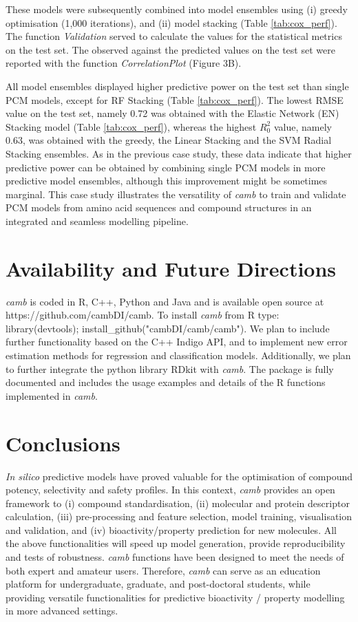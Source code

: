 \documentclass{bmcart}
\begin{document}
These models were subsequently combined into model ensembles using
(i) greedy optimisation (1,000 iterations), and (ii) model stacking (Table \ref{tab:cox_perf}).
The function {\it Validation} served to calculate the values for the statistical metrics on the test set.
The observed against the predicted values on the test set 
were reported with the function {\it CorrelationPlot} (Figure 3B).

All model ensembles displayed higher predictive power on the test set
than single PCM models, except for RF Stacking (Table \ref{tab:cox_perf}).
The lowest RMSE value on the test set, namely 0.72 was obtained 
with the Elastic Network (EN) Stacking model (Table \ref{tab:cox_perf}),
whereas the highest $R^{2}_{0}$ value, namely 0.63,
was obtained with the greedy, the Linear Stacking and the SVM Radial Stacking ensembles.
As in the previous case study,
these data indicate that higher predictive power can be obtained by combining 
single PCM models in more predictive model ensembles,
although this improvement might be sometimes marginal.
This case study illustrates the versatility of {\it camb} to train and validate
PCM models from amino acid sequences and compound structures
in an integrated and seamless modelling pipeline.

\section*{Availability and Future Directions}
{\it camb} is coded in R, C++, Python and Java and is available open source
at https://github.com/cambDI/camb.
To install {\it camb} from R type: library(devtools); install\_github("cambDI/camb/camb").
We plan to include further functionality based on the C++ Indigo API,
and to implement new error estimation methods for regression and classification models.
Additionally, we plan to further integrate the python library RDkit with {\it camb}.
The package is fully documented and includes the usage examples and details of the R functions implemented in {\it camb}.\\

\section*{Conclusions}
{\it In silico} predictive models have proved valuable
for the optimisation of compound potency, selectivity and safety profiles.
In this context, {\it camb} provides an open framework
to (i) compound standardisation, (ii) molecular and protein descriptor calculation,
(iii) pre-processing and feature selection, model training, visualisation and validation, and 
(iv) bioactivity/property prediction for new molecules.
All the above functionalities will speed up model generation, provide reproducibility and tests of robustness.
{\it camb} functions have been designed to meet the needs of both expert and amateur users. 
Therefore, {\it camb} can serve as an education platform for 
undergraduate, graduate, and post-doctoral students,
while providing versatile functionalities for predictive bioactivity / property modelling
in more advanced settings.
\end{document}
